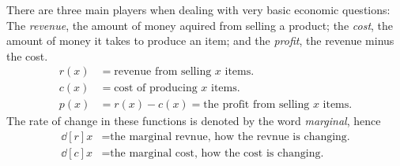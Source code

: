 There are three main players when dealing with very basic economic
questions: The \textit{revenue}, the amount of money aquired from
selling a product; the \textit{cost}, the amount of money it takes to
produce an item; and the \textit{profit}, the revenue minus the cost.
\begin{align*}
r(x) &= \text{revenue from selling $x$ items.}\\
c(x) &= \text{cost of producing $x$ items.}\\
p(x) &= r(x)-c(x) = \text{the profit from selling $x$ items}.
\end{align*}
The rate of change in these functions is denoted by the word \textit{marginal}, hence 
\begin{align*}
\dd[r]{x} &= \text{the marginal revnue, how the revnue is changing.}\\
\dd[c]{x} &= \text{the marginal cost, how the cost is changing.}
\end{align*}

